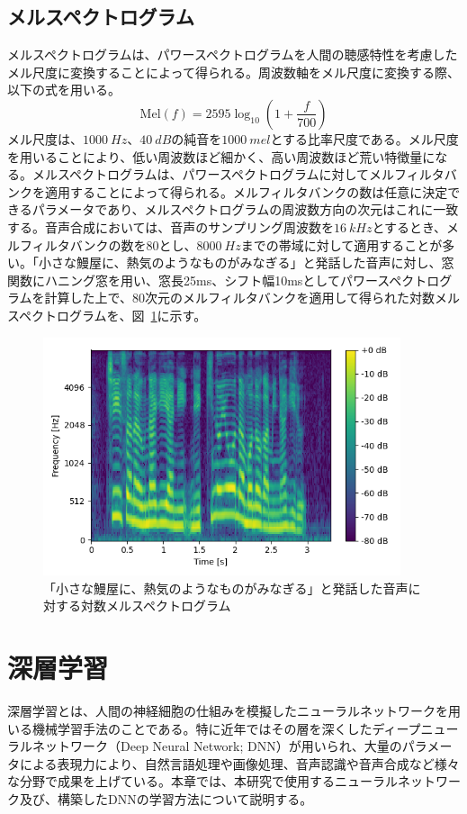 \documentclass[12pt]{jarticle}
\numberwithin{equation}{section}    %
\numberwithin{figure}{section}      %
\numberwithin{table}{section}      %
\begin{document}
\subsection{メルスペクトログラム}
メルスペクトログラムは、パワースペクトログラムを人間の聴感特性を考慮したメル尺度に変換することによって得られる。周波数軸をメル尺度に変換する際、以下の式を用いる。
\begin{equation}
    \text{Mel}(f) = 2595\log_{10} \left(1 + \frac{f}{700}\right)
\end{equation}
メル尺度は、$\SI[]{1000}{Hz}$、$\SI[]{40}{dB}$の純音を$\SI[]{1000}{mel}$とする比率尺度である。メル尺度を用いることにより、低い周波数ほど細かく、高い周波数ほど荒い特徴量になる。メルスペクトログラムは、パワースペクトログラムに対してメルフィルタバンクを適用することによって得られる。メルフィルタバンクの数は任意に決定できるパラメータであり、メルスペクトログラムの周波数方向の次元はこれに一致する。音声合成においては、音声のサンプリング周波数を$\SI[]{16}{kHz}$とするとき、メルフィルタバンクの数を80とし、$\SI[]{8000}{Hz}$までの帯域に対して適用することが多い。「小さな鰻屋に、熱気のようなものがみなぎる」と発話した音声に対し、窓関数にハニング窓を用い、窓長25ms、シフト幅10msとしてパワースペクトログラムを計算した上で、80次元のメルフィルタバンクを適用して得られた対数メルスペクトログラムを、図~\ref{sec2:fig:melspectrogram}に示す。
\begin{figure}[bt]
    \centering
    \includegraphics[height=70mm]{./figure/sec2/melspectrogram.png}
    \caption{「小さな鰻屋に、熱気のようなものがみなぎる」と発話した音声に対する対数メルスペクトログラム}
    \label{sec2:fig:melspectrogram}
\end{figure}

\clearpage

\section{深層学習}
深層学習とは、人間の神経細胞の仕組みを模擬したニューラルネットワークを用いる機械学習手法のことである。特に近年ではその層を深くしたディープニューラルネットワーク（Deep Neural Network; DNN）が用いられ、大量のパラメータによる表現力により、自然言語処理や画像処理、音声認識や音声合成など様々な分野で成果を上げている。本章では、本研究で使用するニューラルネットワーク及び、構築したDNNの学習方法について説明する。
\end{document}
